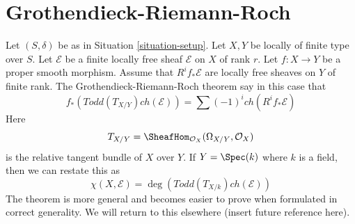 \section{Grothendieck-Riemann-Roch}
\label{section-grr}

\noindent
Let $(S, \delta)$ be as in
Situation \ref{situation-setup}.
Let $X, Y$ be locally of finite type over $S$.
Let $\mathcal{E}$ be a finite locally free sheaf
${\mathcal E}$ on $X$ of rank $r$.
Let $f : X \to Y$ be a proper smooth morphism.
Assume that $R^if_*\mathcal{E}$ are locally free
sheaves on $Y$ of finite rank.
The Grothendieck-Riemann-Roch theorem say in this
case that
$$
f_*(Todd(T_{X/Y}) ch(\mathcal{E}))
=
\sum (-1)^i ch(R^if_*\mathcal{E})
$$
Here
$$
T_{X/Y} = \SheafHom_{\mathcal{O}_X}(\Omega_{X/Y}, \mathcal{O}_X)
$$
is the relative tangent bundle of $X$ over $Y$. If $Y = \Spec(k)$
where $k$ is a field, then we can restate this as
$$
\chi(X, \mathcal{E}) = \deg(Todd(T_{X/k}) ch(\mathcal{E}))
$$
The theorem is more general and becomes easier to prove
when formulated in correct generality. We will return to
this elsewhere (insert future reference here).







